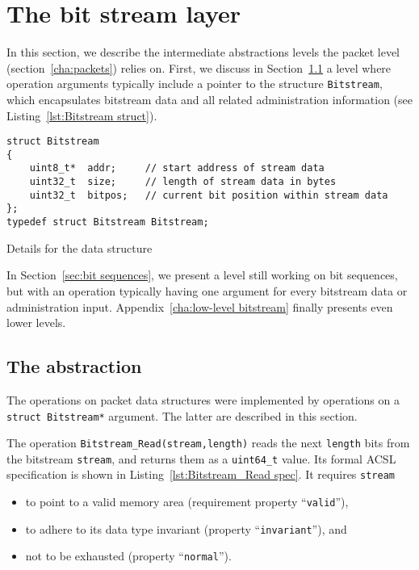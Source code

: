 


\chapter{The bit stream layer}
\label{cha:bitstream}

In this section, we describe the intermediate abstractions levels the
packet level (section~\ref{cha:packets}) relies on.
%
First, we discuss in Section~\ref{sec:bitstream}
a level where operation arguments typically include a pointer to the
\isoc structure \lstinline{Bitstream}, which
encapsulates bitstream data and all related administration information 
(see Listing~\ref{lst:Bitstream struct}).


\begin{listing}[hbt]
\begin{minipage}{0.99\textwidth}
\begin{lstlisting}[style=acsl-block]
struct Bitstream
{
    uint8_t*  addr;     // start address of stream data
    uint32_t  size;     // length of stream data in bytes
    uint32_t  bitpos;   // current bit position within stream data
};
typedef struct Bitstream Bitstream;
\end{lstlisting}
\end{minipage}
\caption{\label{lst:Bitstream struct}
	Details for the  data structure}
\end{listing}

\FloatBarrier

In Section~\ref{sec:bit sequences}, we present a level still working on
bit sequences, but with an operation typically
having one argument for every bitstream data or administration input.
%
Appendix~\ref{cha:low-level bitstream} finally presents even lower levels.






\section{The  abstraction}
\label{sec:bitstream}

The operations on packet data structures were implemented by 
operations on a \lstinline{struct Bitstream*} argument.
%
The latter are described in this section.

The operation 
\lstinline{Bitstream_Read(stream,length)}
reads the next \lstinline{length} bits from the bitstream
\lstinline{stream}, and returns them as a \lstinline{uint64_t} value.
%
Its formal ACSL specification is shown in 
Listing~\ref{lst:Bitstream_Read spec}.
%
It requires \lstinline{stream}
%
\begin{itemize}
\item to point to a valid memory area 
	(requirement property ``\lstinline{valid}''),
\item to adhere to its data type invariant
	(property ``\lstinline{invariant}''), and
\item not to be exhausted (property ``\lstinline{normal}'').
\end{itemize}

